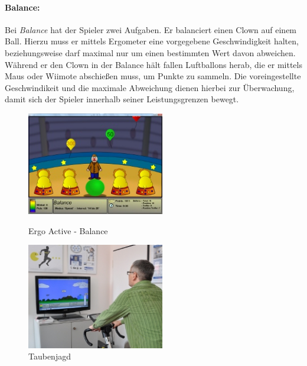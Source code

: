 \paragraph{Balance:}\noindent
Bei \textit{Balance} hat der Spieler zwei Aufgaben. Er balanciert einen Clown auf einem Ball. Hierzu muss er mittels Ergometer eine vorgegebene Geschwindigkeit halten, beziehungsweise darf maximal nur um einen bestimmten Wert davon abweichen. Während er den Clown in der Balance hält fallen Luftballons herab, die er mittels Maus oder Wiimote abschießen muss, um Punkte zu sammeln. Die voreingestellte Geschwindikeit und die maximale Abweichung dienen hierbei zur Überwachung, damit  sich der Spieler innerhalb seiner Leistungsgrenzen bewegt. 
\begin{figure}[ht]
	\centering
	\begin{minipage}[b]{6 cm}
			\includegraphics[width=6cm]{gfx/recherche/balance.jpg} 
			\caption{Ergo Active - Balance}
			\label{balance}
	\end{minipage}
	\begin{minipage}[b]{6 cm}
			\includegraphics[width=6cm]{gfx/recherche/ergoactive.jpg} 
			\caption{Taubenjagd}
			\label{ergoactive}
	\end{minipage}
\end{figure}

